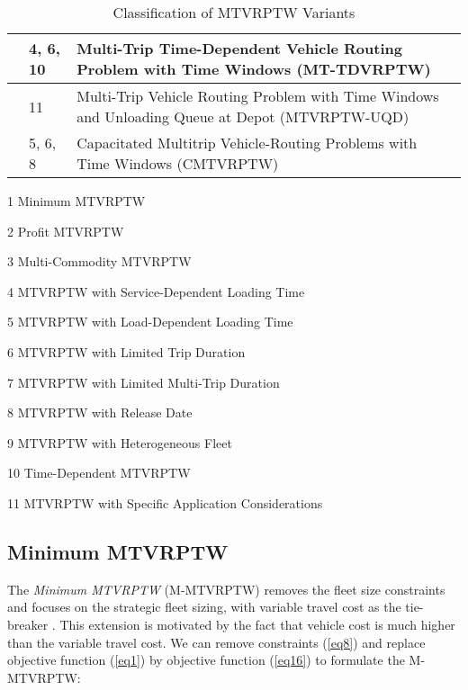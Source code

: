 \begin{table}[]
\begin{threeparttable}
\begin{tabular}{@{}>{\raggedright}p{3cm}>{\raggedright}p{4cm}p{9cm}@{}}
         \midrule
             \cite{pan2021multi}
             & 4, 6, 10
             & Multi-Trip Time-Dependent Vehicle Routing Problem with Time Windows (MT-TDVRPTW) \\
         \midrule
             \cite{huang2021multi}
             & 11
             & Multi-Trip Vehicle Routing Problem with Time Windows and Unloading Queue at Depot (MTVRPTW-UQD) \\
         \midrule
             \cite{yang2023exact}
             & 5, 6, 8
             & Capacitated Multitrip Vehicle-Routing Problems with Time Windows (CMTVRPTW) \\
         \bottomrule
    \end{tabular}
    \begin{tablenotes}
        \item[1] Minimum MTVRPTW 
        \item[2] Profit MTVRPTW
        \item[3] Multi-Commodity MTVRPTW
        \item[4] MTVRPTW with Service-Dependent Loading Time 
        \item[5] MTVRPTW with Load-Dependent Loading Time 
        \item[6] MTVRPTW with Limited Trip Duration
        \item[7] MTVRPTW with Limited Multi-Trip Duration
        \item[8] MTVRPTW with Release Date
        \item[9] MTVRPTW with Heterogeneous Fleet
        \item[10] Time-Dependent MTVRPTW
        \item[11] MTVRPTW with Specific Application Considerations
    \end{tablenotes}
    \caption{Classification of MTVRPTW Variants}
    \label{table:1}
    \end{threeparttable}
\end{table}

\subsection{Minimum MTVRPTW}
\label{subsec:minimum}

The \textit{Minimum MTVRPTW} (M-MTVRPTW) removes the fleet size constraints and focuses on the strategic fleet sizing, with variable travel cost as the tie-breaker \cite[e.g.,][]{battarra2009adaptive, cattaruzza2014iterated}.  This extension is motivated by the fact that vehicle cost is much higher than the variable travel cost.  We can remove constraints (\ref{eq8}) and replace objective function (\ref{eq1}) by objective function (\ref{eq16}) to formulate the M-MTVRPTW:

